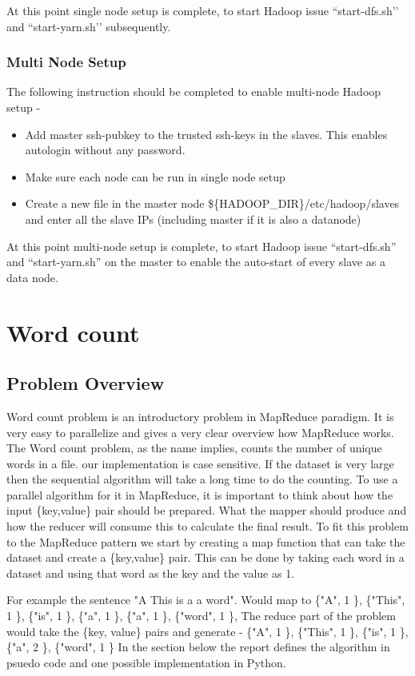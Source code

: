 \documentclass{article}
\begin{document}
At this point single node setup is complete, to start Hadoop issue ``start-dfs.sh’’ and ``start-yarn.sh’’ subsequently.

\subsubsection{Multi Node Setup}
The following instruction should be completed to enable multi-node Hadoop setup -
\begin{itemize}
\item Add master ssh-pubkey to the trusted ssh-keys in the slaves. This enables autologin without any password.
\item Make sure each node can be run in single node setup
\item Create a new file in the master node  \$\{HADOOP\_DIR\}/etc/hadoop/slaves and enter all the slave IPs (including master if it is also a datanode)
\end{itemize}

At this point multi-node setup is complete, to start Hadoop issue ``start-dfs.sh'' and ``start-yarn.sh'' on the master to enable the auto-start of every slave as a data node.

\section{Word count}
\subsection{Problem Overview}
Word count problem is an introductory problem in MapReduce paradigm. It is very easy to parallelize and gives a very clear overview how MapReduce works.
\BlankLine The Word count problem, as the name implies, counts the number of unique words in a file. our implementation is case sensitive. If the dataset is very large then the sequential algorithm will take a long time to do the counting.
To use a parallel algorithm for it in MapReduce, it is important to think about how the input \{key,value\} pair should be prepared. What the mapper should produce and how the reducer will consume this to calculate the final result.
To fit this problem to the MapReduce pattern we start by creating a map function that can take the dataset and create a \{key,value\} pair.
This can be done by taking each word in a dataset and using that word as the key and the value as 1.

 For example the sentence "A This is a a word". Would map to
 \BlankLine \{"A", 1 \}, \{"This", 1 \}, \{"is", 1 \}, \{"a", 1 \}, \{"a", 1 \}, \{"word", 1 \}, \BlankLine The reduce part of the problem would take the \{key, value\} pairs and generate -
\BlankLine \{"A", 1 \}, \{"This", 1 \}, \{"is", 1 \}, \{"a", 2 \}, \{"word", 1 \}
\BlankLine In the section below the report defines the algorithm in psuedo code and one possible implementation in Python.
\end{document}

